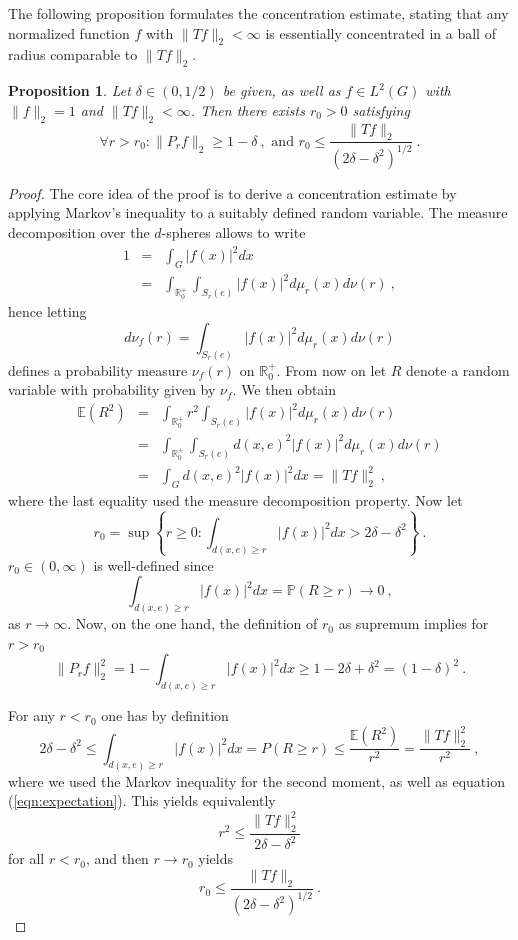 \documentclass[12pt, reqno]{amsart}
\newtheorem{proposition}[theorem]{Proposition}
\begin{document}
The following proposition formulates the concentration estimate, stating that any normalized function $f$ with $\| T f \|_2< \infty$ is essentially concentrated in a ball of radius comparable to $\| T f \|_2$.
\begin{proposition} \label{prop:main}
Let $\delta \in (0,1/2)$ be given, as well as $f \in L^2(G)$ with $\| f \|_2 = 1$ and $\| Tf \|_2 < \infty$. Then there exists $r_0 >0$ satisfying 
\[
\forall r > r_0: \| P_{r} f \|_2 \ge 1 - \delta~, \mbox{ and } r_0 \le \frac{\| T f \|_2}{\left(2 \delta - \delta^2 \right)^{1/2}}~.
\]
\end{proposition}
\begin{proof} The core idea of the proof is to derive a concentration estimate by applying Markov's inequality to a suitably defined random variable. The measure decomposition over the $d$-spheres allows to write
\begin{eqnarray*}
 1 & = & \int_G |f(x)|^2 dx \\
  & = & \int_{\mathbb{R}_0^+} \int_{S_r(e)} |f(x)|^2 d\mu_r(x) d\nu(r)~,
\end{eqnarray*}
hence letting  
\[
d\nu_f(r) = \int_{S_r(e)} |f(x)|^2 d\mu_r(x) d\nu(r)
\] defines a probability measure $\nu_f(r)$ on $\mathbb{R}_0^+$. From now on let $R$ denote a random variable with probability given by $\nu_f$. We then obtain
\begin{eqnarray}
 \nonumber    \mathbb{E}(R^2) & = & \int_{\mathbb{R}_0^+} r^2 \int_{S_r(e)} |f(x)|^2 d\mu_r(x) d\nu(r) \\
 \nonumber   & = & \int_{\mathbb{R}_0^+} \int_{S_r(e)} d(x,e)^2 |f(x)|^2 d\mu_r(x) d\nu(r) \\
 \label{eqn:expectation}   & = & \int_G d(x,e)^2 |f(x)|^2 dx = \| T f \|_2^2 ~,
\end{eqnarray}
where the last equality used the measure decomposition property. 
Now let 
\[
r_0 = \sup \left\{ r \ge 0: \int_{d(x,e) \ge r} |f(x)|^2 dx > 2 \delta - \delta^2 \right\}~.
\]
$r_0 \in (0,\infty)$ is well-defined since 
\[
\int_{d(x,e) \ge r} |f(x)|^2 dx = \mathbb{P} (R \ge r) \to 0 ~,
\]
 as $r \to \infty$. 
 Now, on the one hand, the definition of $r_0$ as supremum implies for $r>r_0$
 \begin{equation} \label{eqn:deliverable_1}
  \| P_{r} f \|_2^2  = 1 - \int_{d(x,e) \ge r} |f(x)|^2 dx \ge 1-2 \delta + \delta^2 = (1-\delta)^2~. 
 \end{equation}
 
 For any $r < r_0$ one has by definition 
 \[ 2 \delta - \delta^2 \le \int_{d(x,e) \ge r}|f(x)|^2 dx = P(R \ge r) \le \frac{\mathbb{E}(R^2)}{r^2} = \frac{\| T f \|_2^2}{r^2}~, \]
 where we used the Markov inequality for the second moment, as well as equation (\ref{eqn:expectation}).
This yields equivalently 
\[ r^2 \le \frac{\| Tf \|_2^2}{2 \delta - \delta^2}
\] for all $r < r_0$, and then $r \to r_0$ yields
\[
r_0 \le \frac{\| T f\|_2}{\left(2 \delta - \delta^2\right)^{1/2}}~.
\]
\end{proof}
\end{document}
